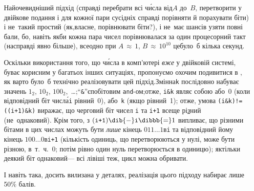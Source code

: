 \Tutorial	{}
Найочевидніший підхід (справді перебрати всі ч\'{и}сла від\nolinebreak[2] $A$ до~$B$, перетворити у двійкове подання і для кожної пари сусідніх справді порівняти й порахувати біти) і не~такий простий (як,\nolinebreak[2] власне, порівнювати біти?), і не~має шансів узяти повні бали, бо, навіть якби кожна пара чисел порівнювалася за один процесорний такт 
(насправді явно більше), 
все\nolinebreak[2] одно при ${A\,{\approx}\,1}$,\hspace{0.125em plus 0.25em} ${B\,{\approx}\,10^{10}}$ це\nolinebreak[2] було~б кілька секунд. 

Оскільки використання того, що ч\'{и}сла в комп'ютері \emph{вже} у двійковій системі, буває корисним у багатьох інших ситуаціях, пропонуємо охочим подивитися в \nolinebreak\hspace{0.125em}, як варто було~б технічно реалізовувати цей підхід.\linebreak[2] Змінна\nolinebreak[3] \texttt{k} послідовно набуває значень 
$1_{2}$,
$10_{2}$, 
$100_{2}$,~\dots;\linebreak[2]
``\verb"&"''\nolinebreak[3] 
є\nolinebreak[2] 
побітовим \texttt{and}-ом;\linebreak[2]
отже, 
\verb"i&k" являє собою або~0 (коли відповідний біт числ\'{а}\nolinebreak[3] \texttt{i} рівний~0), або~\texttt{k} (якщо рівний~1); отже, умова \verb"(i&k)"\nolinebreak[3]\hspace{0.25em plus 0.25em}\verb"!="\nolinebreak[2]\hspace{0.25em plus 0.25em}\verb"((i+1)&k)" виражає, що черговий біт чисел \verb"i" та \verb"i+1" все\nolinebreak[3] ще рі\underline{\emph{з}}ний (не~однаковий). Крім того, з ${(\texttt{i+1})}\dib{{-}}\texttt{i}\dibbb{{=}}1$ випливає, що різними бітами в цих числах можуть бути \emph{лише} кінець ${011\dots1}$\nolinebreak[2] в\nolinebreak[3] \verb"i" та відповідний йому кінець ${100\dots0}$\nolinebreak[2] в\nolinebreak[3] \verb"i+1" (кількість одиниць, що перетворюються у нулі, може бути різною, в~т.~ч.~0; потім рівно один нуль перетворюється в одиницю); 
як\nolinebreak[2] тільки деякий біт однаковий\nolinebreak[3] --- всі лівіші теж, цикл можна обривати.

І навіть така, досить вилизана у деталях, реалізація цього підходу набирає лише 50\% балів. 

